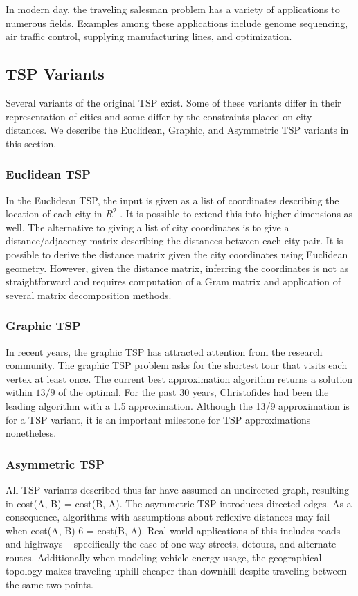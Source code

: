 \documentclass[10pt,twocolumn,letterpaper]{article}
\begin{document}
In modern day, the traveling salesman problem has a variety of applications to numerous fields. Examples among
these applications include genome sequencing, air traffic control, supplying manufacturing lines, and optimization.

\subsection{TSP Variants}
Several variants of the original TSP exist. Some of these
variants differ in their representation of cities and some differ
by the constraints placed on city distances. We describe the
Euclidean, Graphic, and Asymmetric TSP variants in this
section.
\subsubsection{Euclidean TSP}
In the Euclidean TSP, the input is given as a list of coordinates describing the location of each city in $R^2$ \cite{arora1996polynomial}. It is
possible to extend this into higher dimensions as well. The
alternative to giving a list of city coordinates is to give a
distance/adjacency matrix describing the distances between
each city pair. It is possible to derive the distance matrix given the city coordinates using Euclidean geometry.
However, given the distance matrix, inferring the coordinates is not as straightforward and requires computation of
a Gram matrix and application of several matrix decomposition methods.

\subsubsection{Graphic TSP}
In recent years, the graphic TSP has attracted attention
from the research community. The graphic TSP problem
asks for the shortest tour that visits each vertex at least
once. The current best approximation algorithm returns a
solution within $13/9$ of the optimal\cite{mucha2014frac}. For the
past 30 years, Christofides had been the leading algorithm
with a 1.5 approximation. Although the 13/9 approximation
is for a TSP variant, it is an important milestone for TSP
approximations nonetheless.

\subsubsection{Asymmetric TSP}
All TSP variants described thus far have assumed an undirected graph, resulting in cost(A, B) = cost(B, A). The
asymmetric TSP introduces directed edges. As a consequence, algorithms with assumptions about reflexive distances may fail when cost(A, B) 6 = cost(B, A). Real world
applications of this includes roads and highways – specifically the case of one-way streets, detours, and alternate
routes. Additionally when modeling vehicle energy usage,
the geographical topology makes traveling uphill cheaper
than downhill despite traveling between the same two points.
\end{document}
